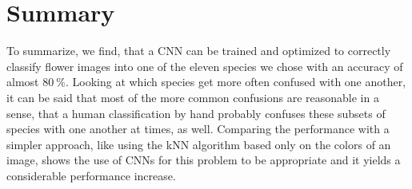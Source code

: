 \section{Summary}
\label{sec:summary}
To summarize, we find, that a CNN can be trained and optimized to correctly classify flower images into one of the eleven species we chose with an accuracy of almost $\SI{80}{\percent}$.
Looking at which species get more often confused with one another, it can be said that most of the more common confusions are reasonable in a sense, that a human classification by hand
probably confuses these subsets of species with one another at times, as well.
Comparing the performance with a simpler approach, like using the kNN algorithm based only on the colors of an image, shows the use of CNNs for this problem to be appropriate 
and it yields a considerable performance increase.
